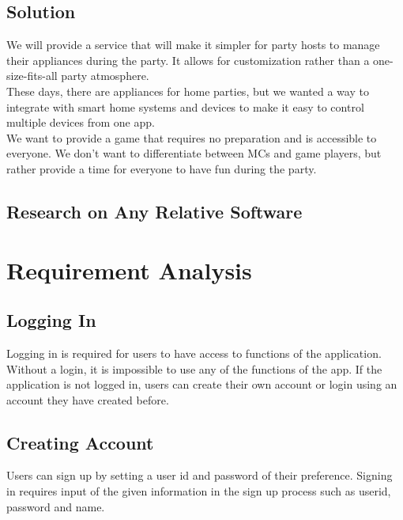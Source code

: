 \documentclass[conference]{IEEEtran}
\begin{document}
    \subsection{Solution}
        We will provide a service that will make it simpler for party hosts to manage their appliances during the party. It allows for customization rather than a one-size-fits-all party atmosphere.\\
        These days, there are appliances for home parties, but we wanted a way to integrate with smart home systems and devices to make it easy to control multiple devices from one app.\\
    	We want to provide a game that requires no preparation and is accessible to everyone. We don't want to differentiate between MCs and game players, but rather provide a time for everyone to have fun during the party.

    \subsection{Research on Any Relative Software}
    
    \section{Requirement Analysis}
    
    \subsection{Logging In}
    Logging in is required for users to have access to functions of the application. Without a login, it is impossible to use any of the functions of the app. If the application is not logged in, users can create their own account or login using an account they have created before. 
    
    \subsection{Creating Account}
    Users can sign up by setting a user id and password of their preference. Signing in requires input  of the given information in the sign up process such as userid, password and name.
    
\end{document}
